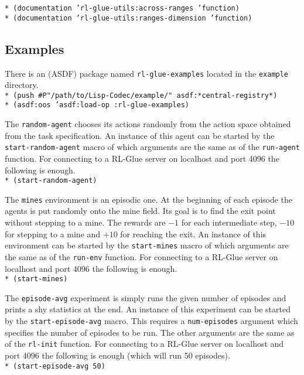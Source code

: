 \documentclass[11pt,a4paper,dvipdfm]{article}
\newcommand{\prompttext}[1]{\texttt{#1}}
\newcommand{\lispprompt}[1]{\prompttext{* #1}}
\begin{document}
\lispprompt{(documentation 'rl-glue-utils:across-ranges 'function)} \\
\lispprompt{(documentation 'rl-glue-utils:ranges-dimension 'function)}

\hypertarget{examples}{\subsection{Examples}}

There is an (ASDF) package named \prompttext{rl-glue-examples} located
in the \prompttext{example} directory. \\
\lispprompt{(push \#P"/path/to/Lisp-Codec/example/" asdf:*central-registry*)} \\
\lispprompt{(asdf:oos 'asdf:load-op :rl-glue-examples)}

The \prompttext{random-agent} chooses its actions randomly from the action
space obtained from the task specification. An instance of this agent can be
started by the \prompttext{start-random-agent} macro of which arguments are the
same as of the \prompttext{run-agent} function. For connecting to a RL-Glue
server on localhost and port 4096 the following is enough. \\
\lispprompt{(start-random-agent)}

The \prompttext{mines} environment is an episodic one. At the beginning of
each episode the agents is put randomly onto the mine field. Its goal is to
find the exit point without stepping to a mine. The rewards are $-1$ for each
intermediate step, $-10$ for stepping to a mine and $+10$ for reaching the exit.
An instance of this environment can be started by the \prompttext{start-mines}
macro of which arguments are the same as of the \prompttext{run-env} function.
For connecting to a RL-Glue server on localhost and port 4096 the following is
enough. \\
\lispprompt{(start-mines)}

The \prompttext{episode-avg} experiment is simply runs the given number of
episodes and prints a shy statistics at the end. An instance of this
experiment can be started by the \prompttext{start-episode-avg} macro. This
requires a \prompttext{num-episodes} argument which specifies the number of
episodes to be run. The other arguments are the same as of the
\prompttext{rl-init} function. For connecting to a RL-Glue server on localhost
and port 4096 the following is enough (which will run 50 episodes). \\
\lispprompt{(start-episode-avg 50)}
\end{document}
